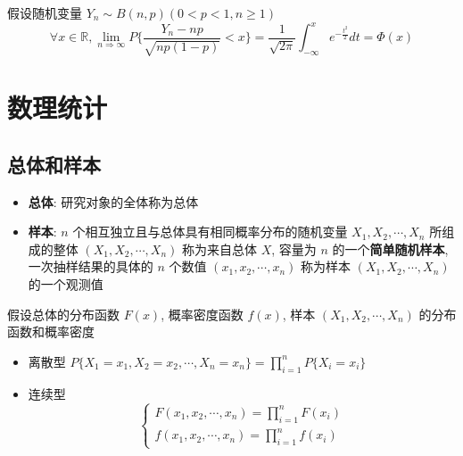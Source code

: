 \begin{theorem}
	假设随机变量 $Y_{n}\sim B(n,p)(0 < p < 1, n\geq 1)$
	$$\forall x\in \mathbb{R}, \lim\limits_{n\Rightarrow \infty}P\{\dfrac{Y_{n}-np}{\sqrt{np(1-p)}}<x\}=\dfrac{1}{\sqrt{2\pi}}\int_{-\infty}^{x}e^{-\frac{t^2}{2}}dt = \varPhi(x)$$
\end{theorem}

\chapter{数理统计}
\section{总体和样本}
\begin{definition}[统计概念和统计量]
	\begin{itemize}
		\item \textbf{总体}: 研究对象的全体称为总体
		\item \textbf{样本}: $n$ 个相互独立且与总体具有相同概率分布的随机变量 $X_{1}, X_{2}, \cdots, X_{n}$ 所组成的整体 $(X_{1}, X_{2}, \cdots, X_{n})$ 
		称为来自总体 $X$, 容量为 $n$ 的一个\textbf{简单随机样本}, 一次抽样结果的具体的 $n$ 个数值 $(x_{1},x_{2},\cdots,x_{n})$ 称为样本 $(X_{1},X_{2},\cdots,X_{n})$ 的一个观测值
	\end{itemize}
\end{definition}

\begin{definition}[样本分布]
	假设总体的分布函数 $F(x)$, 概率密度函数 $f(x)$, 样本 $(X_{1},X_{2},\cdots,X_{n})$ 的分布函数和概率密度
	\begin{itemize}
		\item 离散型 $P\{X_{1} = x_{1}, X_{2} = x_{2}, \cdots, X_{n} = x_{n}\} = \prod\limits_{i = 1}^{n}P\{X_{i} = x_{i}\}$
		\item 连续型 
		$$\begin{cases}
			F(x_{1},x_{2},\cdots,x_{n}) = \prod\limits_{i = 1}^{n}F(x_{i})\\
			f(x_{1},x_{2},\cdots,x_{n}) = \prod\limits_{i = 1}^{n}f(x_{i})
		\end{cases}$$
	\end{itemize}
\end{definition}

